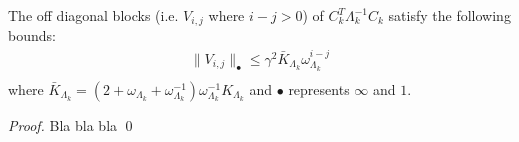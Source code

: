 \begin{proposition}
The off diagonal blocks (i.e. $V_{i,j}$ where $i - j > 0$) of $C_k^T \Lambda_k^{-1} C_k$ satisfy the following bounds:
\begin{subequations}
\begin{align}
\| V_{i,j} \|_\bullet \leq \gamma^2 \bar{K}_{\Lambda_k} \omega_{\Lambda_k}^{i-j} \\
\end{align}
\end{subequations}
where $\bar{K}_{\Lambda_k} = (2 + \omega_{\Lambda_k} + \omega_{\Lambda_k}^{-1}) \omega_{\Lambda_k}^{-1} K_{\Lambda_k}$ and $\bullet$ represents $\infty$ and $1$.
\end{proposition}
\begin{proof}
Bla bla bla
\qed
\end{proof}


